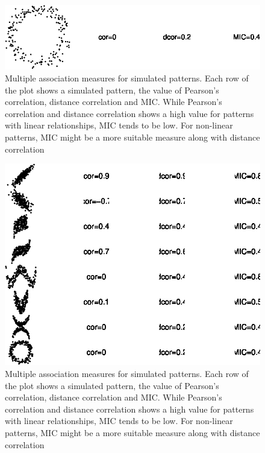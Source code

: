 \begin{Schunk}
\begin{figure}
{\centering \includegraphics{rj_paper_files/figure-latex/motivation1-8} 

}

\caption[Multiple association measures for simulated patterns]{Multiple association measures for simulated patterns. Each row of the plot shows a simulated pattern, the value of Pearson's correlation, distance correlation and MIC. While Pearson's correlation and distance correlation shows a high value for patterns with linear relationships, MIC tends to be low. For non-linear patterns, MIC might be a more suitable measure along with distance correlation}\label{fig:motivation1-8}
\end{figure}
\begin{figure}

{\centering \includegraphics{rj_paper_files/figure-latex/motivation1-9} 

}

\caption[Multiple association measures for simulated patterns]{Multiple association measures for simulated patterns. Each row of the plot shows a simulated pattern, the value of Pearson's correlation, distance correlation and MIC. While Pearson's correlation and distance correlation shows a high value for patterns with linear relationships, MIC tends to be low. For non-linear patterns, MIC might be a more suitable measure along with distance correlation}\label{fig:motivation1-9}
\end{figure}
\end{Schunk}

